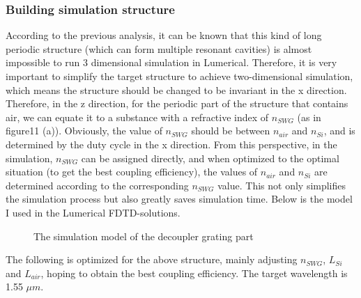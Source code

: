\documentclass[]{article}
\begin{document}
\subsubsection{Building simulation structure}

According to the previous analysis, it can be known that this kind of long periodic structure (which can form multiple resonant cavities) is almost impossible to run 3 dimensional simulation in Lumerical. Therefore, it is very important to simplify the target structure to achieve two-dimensional simulation, which means the structure should be changed to be invariant in the x direction. Therefore, in the z direction, for the periodic part of the structure that contains air, we can equate it to a substance with a refractive index of $n_{SWG}$ (as in figure11 (a)). Obviously, the value of $n_{SWG}$ should be between $n_{air}$ and $n_{Si}$, and is determined by the duty cycle in the x direction. From this perspective, in the simulation, $n_{SWG}$ can be assigned directly, and when optimized to the optimal situation (to get the best coupling efficiency), the values of $n_{air}$ and $n_{Si}$ are determined according to the corresponding $n_{SWG}$ value. This not only simplifies the simulation process but also greatly saves simulation time. Below is the model I used in the Lumerical FDTD-solutions.

\begin{figure}[H]
	\centering
	\caption{The simulation model of the decoupler grating part}
	\label{fig:figure5}
\end{figure}

The following is optimized for the above structure, mainly adjusting $n_{SWG}$, $L_{Si}$ and $L_{air}$, hoping to obtain the best coupling efficiency. The target wavelength is 1.55 $\mu m$.
\end{document}
